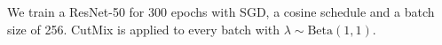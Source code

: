 We train a ResNet-50 for 300 epochs with SGD, a cosine schedule and a batch size of 256. CutMix is
applied to every batch with $\lambda \sim \mathrm{Beta}(1, 1)$.
